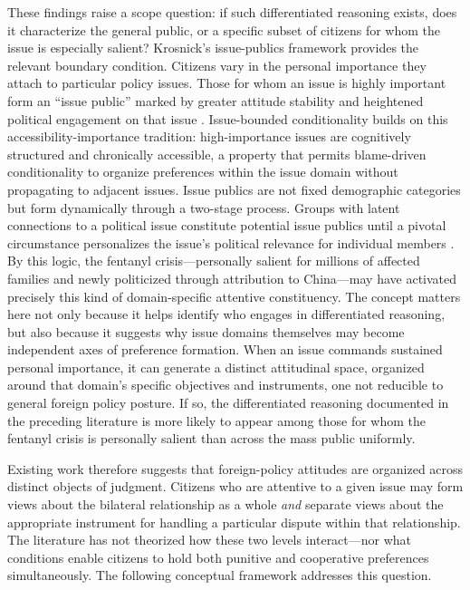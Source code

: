 \documentclass[12pt,letterpaper]{article}
\begin{document}
These findings raise a scope question: if such differentiated reasoning exists, does it characterize the general public, or a specific subset of citizens for whom the issue is especially salient? Krosnick's issue-publics framework provides the relevant boundary condition. Citizens vary in the personal importance they attach to particular policy issues. Those for whom an issue is highly important form an ``issue public'' marked by greater attitude stability and heightened political engagement on that issue \citep{krosnick_attitude_1989, krosnick_government_1990, krosnick_public_1995}. Issue-bounded conditionality builds on this accessibility-importance tradition: high-importance issues are cognitively structured and chronically accessible, a property that permits blame-driven conditionality to organize preferences within the issue domain without propagating to adjacent issues. Issue publics are not fixed demographic categories but form dynamically through a two-stage process. Groups with latent connections to a political issue constitute potential issue publics until a pivotal circumstance personalizes the issue's political relevance for individual members \citep{rossiter_development_2026}. By this logic, the fentanyl crisis---personally salient for millions of affected families and newly politicized through attribution to China---may have activated precisely this kind of domain-specific attentive constituency. The concept matters here not only because it helps identify who engages in differentiated reasoning, but also because it suggests why issue domains themselves may become independent axes of preference formation. When an issue commands sustained personal importance, it can generate a distinct attitudinal space, organized around that domain's specific objectives and instruments, one not reducible to general foreign policy posture. If so, the differentiated reasoning documented in the preceding literature is more likely to appear among those for whom the fentanyl crisis is personally salient than across the mass public uniformly.

Existing work therefore suggests that foreign-policy attitudes are organized across distinct objects of judgment. Citizens who are attentive to a given issue may form views about the bilateral relationship as a whole \emph{and} separate views about the appropriate instrument for handling a particular dispute within that relationship. The literature has not theorized how these two levels interact---nor what conditions enable citizens to hold both punitive and cooperative preferences simultaneously. The following conceptual framework addresses this question.
\end{document}
